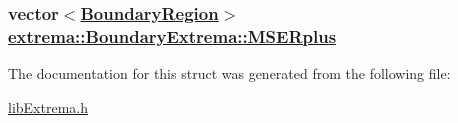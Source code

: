 \hypertarget{structextrema_1_1BoundaryExtrema_84384a7b9bfd20b510924728d7768375}{
\subsubsection[MSERplus]{\setlength{\rightskip}{0pt plus 5cm}vector$<$\hyperlink{structextrema_1_1BoundaryRegion}{Boundary\-Region}$>$ \hyperlink{structextrema_1_1BoundaryExtrema_84384a7b9bfd20b510924728d7768375}{extrema::Boundary\-Extrema::MSERplus}}}
\label{structextrema_1_1BoundaryExtrema_84384a7b9bfd20b510924728d7768375}




The documentation for this struct was generated from the following file:\begin{CompactItemize}
\item 
\hyperlink{libExtrema_8h}{lib\-Extrema.h}\end{CompactItemize}
